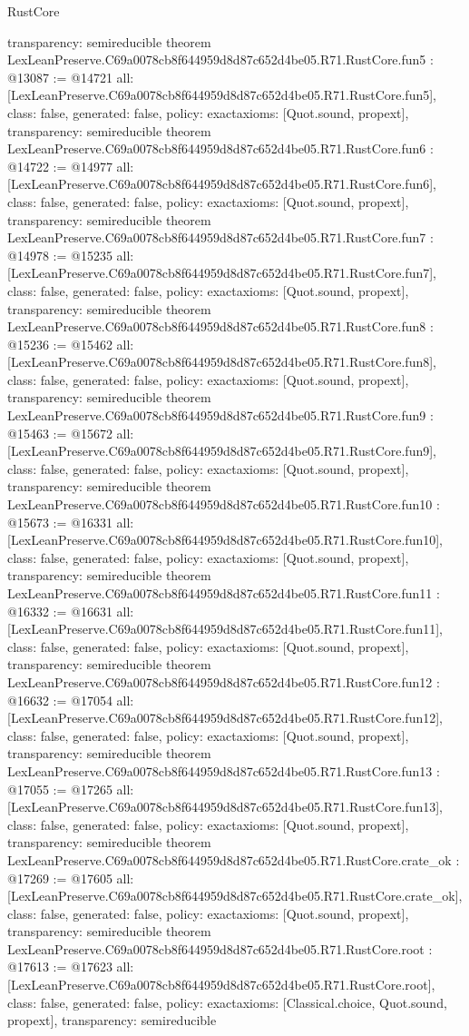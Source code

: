 \begin{lexlean}{RustCore}
\begin{coremodule}
{  transparency: semireducible
}
theorem LexLeanPreserve.C69a0078cb8f644959d8d87c652d4be05.R71.RustCore.fun5 : @13087 := @14721 {
  all: [LexLeanPreserve.C69a0078cb8f644959d8d87c652d4be05.R71.RustCore.fun5],
  class: false,
  generated: false,
  policy: exact{axioms: [Quot.sound, propext]},
  transparency: semireducible
}
theorem LexLeanPreserve.C69a0078cb8f644959d8d87c652d4be05.R71.RustCore.fun6 : @14722 := @14977 {
  all: [LexLeanPreserve.C69a0078cb8f644959d8d87c652d4be05.R71.RustCore.fun6],
  class: false,
  generated: false,
  policy: exact{axioms: [Quot.sound, propext]},
  transparency: semireducible
}
theorem LexLeanPreserve.C69a0078cb8f644959d8d87c652d4be05.R71.RustCore.fun7 : @14978 := @15235 {
  all: [LexLeanPreserve.C69a0078cb8f644959d8d87c652d4be05.R71.RustCore.fun7],
  class: false,
  generated: false,
  policy: exact{axioms: [Quot.sound, propext]},
  transparency: semireducible
}
theorem LexLeanPreserve.C69a0078cb8f644959d8d87c652d4be05.R71.RustCore.fun8 : @15236 := @15462 {
  all: [LexLeanPreserve.C69a0078cb8f644959d8d87c652d4be05.R71.RustCore.fun8],
  class: false,
  generated: false,
  policy: exact{axioms: [Quot.sound, propext]},
  transparency: semireducible
}
theorem LexLeanPreserve.C69a0078cb8f644959d8d87c652d4be05.R71.RustCore.fun9 : @15463 := @15672 {
  all: [LexLeanPreserve.C69a0078cb8f644959d8d87c652d4be05.R71.RustCore.fun9],
  class: false,
  generated: false,
  policy: exact{axioms: [Quot.sound, propext]},
  transparency: semireducible
}
theorem LexLeanPreserve.C69a0078cb8f644959d8d87c652d4be05.R71.RustCore.fun10 : @15673 := @16331 {
  all: [LexLeanPreserve.C69a0078cb8f644959d8d87c652d4be05.R71.RustCore.fun10],
  class: false,
  generated: false,
  policy: exact{axioms: [Quot.sound, propext]},
  transparency: semireducible
}
theorem LexLeanPreserve.C69a0078cb8f644959d8d87c652d4be05.R71.RustCore.fun11 : @16332 := @16631 {
  all: [LexLeanPreserve.C69a0078cb8f644959d8d87c652d4be05.R71.RustCore.fun11],
  class: false,
  generated: false,
  policy: exact{axioms: [Quot.sound, propext]},
  transparency: semireducible
}
theorem LexLeanPreserve.C69a0078cb8f644959d8d87c652d4be05.R71.RustCore.fun12 : @16632 := @17054 {
  all: [LexLeanPreserve.C69a0078cb8f644959d8d87c652d4be05.R71.RustCore.fun12],
  class: false,
  generated: false,
  policy: exact{axioms: [Quot.sound, propext]},
  transparency: semireducible
}
theorem LexLeanPreserve.C69a0078cb8f644959d8d87c652d4be05.R71.RustCore.fun13 : @17055 := @17265 {
  all: [LexLeanPreserve.C69a0078cb8f644959d8d87c652d4be05.R71.RustCore.fun13],
  class: false,
  generated: false,
  policy: exact{axioms: [Quot.sound, propext]},
  transparency: semireducible
}
theorem LexLeanPreserve.C69a0078cb8f644959d8d87c652d4be05.R71.RustCore.crate_ok : @17269 := @17605 {
  all: [LexLeanPreserve.C69a0078cb8f644959d8d87c652d4be05.R71.RustCore.crate_ok],
  class: false,
  generated: false,
  policy: exact{axioms: [Quot.sound, propext]},
  transparency: semireducible
}
theorem LexLeanPreserve.C69a0078cb8f644959d8d87c652d4be05.R71.RustCore.root : @17613 := @17623 {
  all: [LexLeanPreserve.C69a0078cb8f644959d8d87c652d4be05.R71.RustCore.root],
  class: false,
  generated: false,
  policy: exact{axioms: [Classical.choice, Quot.sound, propext]},
  transparency: semireducible
}


\end{coremodule}
\end{lexlean}

